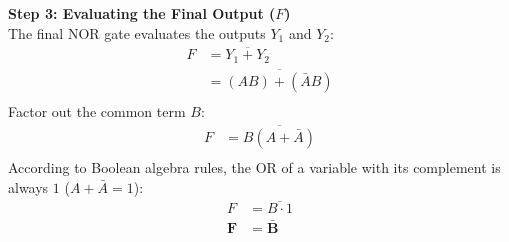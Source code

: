 \documentclass[12pt, a4paper]{article}
\begin{document}
\begin{solutionbox}
																																																																																																																																				    \textbf{Step 3: Evaluating the Final Output ($F$)} \\
																																																																																																																																				        The final NOR gate evaluates the outputs $Y_1$ and $Y_2$:
																																																																																																																																					    \begin{align*}
																																																																																																																																					            F &= \overline{Y_1 + Y_2} \\
																																																																																																																																						              &= \overline{(AB) + (\bar{A}B)} \\
																																																																																																																																							          \end{align*}
																																																																																																																																								      Factor out the common term $B$:
																																																																																																																																								          \begin{align*}
																																																																																																																																									          F &= \overline{B(A + \bar{A})} \\
																																																																																																																																										      \end{align*}
																																																																																																																																										          According to Boolean algebra rules, the OR of a variable with its complement is always $1$ ($A + \bar{A} = 1$):
																																																																																																																																											      \begin{align*}
																																																																																																																																											              F &= \overline{B \cdot 1} \\
																																																																																																																																												              \mathbf{F} &= \mathbf{\bar{B}}
																																																																																																																																													          \end{align*}


\end{solutionbox}
\end{document}
